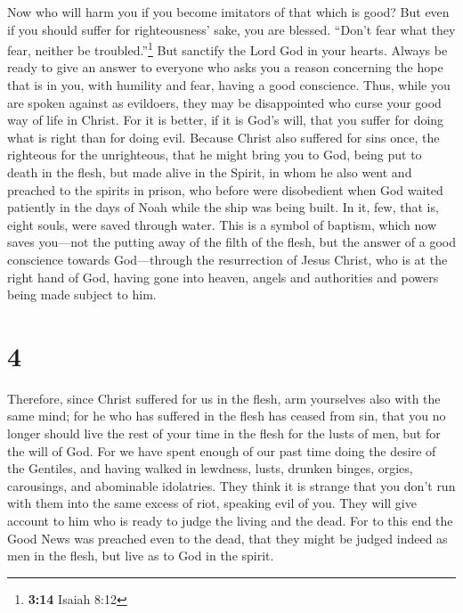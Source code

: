  Now who will harm you if you become imitators of that
which is good?  But even if you should suffer for
righteousness' sake, you are blessed. ``Don't fear what they fear,
neither be troubled.''\footnote{\textbf{3:14} Isaiah 8:12}
 But sanctify the Lord God in your hearts. Always be
ready to give an answer to everyone who asks you a reason concerning the
hope that is in you, with humility and fear,  having a
good conscience. Thus, while you are spoken against as evildoers, they
may be disappointed who curse your good way of life in Christ.
 For it is better, if it is God's will, that you suffer
for doing what is right than for doing evil.  Because
Christ also suffered for sins once, the righteous for the unrighteous,
that he might bring you to God, being put to death in the flesh, but
made alive in the Spirit,  in whom he also went and
preached to the spirits in prison,  who before were
disobedient when God waited patiently in the days of Noah while the ship
was being built. In it, few, that is, eight souls, were saved through
water.  This is a symbol of baptism, which now saves
you---not the putting away of the filth of the flesh, but the answer of
a good conscience towards God---through the resurrection of Jesus
Christ,  who is at the right hand of God, having gone
into heaven, angels and authorities and powers being made subject to
him.

\hypertarget{section-3}{%
\section{4}\label{section-3}}

 Therefore, since Christ suffered for us in the flesh, arm
yourselves also with the same mind; for he who has suffered in the flesh
has ceased from sin,  that you no longer should live the
rest of your time in the flesh for the lusts of men, but for the will of
God.  For we have spent enough of our past time doing the
desire of the Gentiles, and having walked in lewdness, lusts, drunken
binges, orgies, carousings, and abominable idolatries. 
They think it is strange that you don't run with them into the same
excess of riot, speaking evil of you.  They will give
account to him who is ready to judge the living and the dead.
 For to this end the Good News was preached even to the
dead, that they might be judged indeed as men in the flesh, but live as
to God in the spirit.

